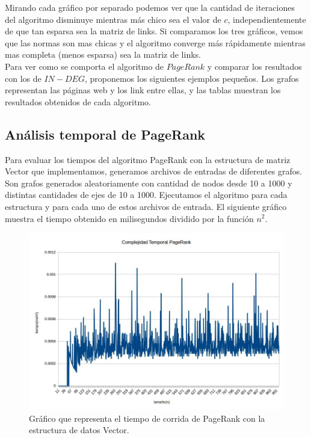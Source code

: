 Mirando cada gráfico por separado podemos ver que la cantidad de iteraciones del algoritmo disminuye mientras más chico sea el valor de $c$, independientemente de que tan esparsa sea la matriz de links. 
Si comparamos los tres gráficos, vemos que las normas son mas chicas y el algoritmo converge más rápidamente mientras mas completa (menos esparsa) sea la matriz de links.\\






Para ver como se comporta el algoritmo de $PageRank$ y comparar los resultados con los de $IN-DEG$, proponemos los siguientes ejemplos pequeños. Los grafos representan las páginas web y los link entre ellas, y las tablas muestran los resultados obtenidos de cada algoritmo.\\




\subsection{Análisis temporal de PageRank}

Para evaluar los tiempos del algoritmo PageRank con la estructura de matriz Vector que implementamos, generamos archivos de entradas de diferentes grafos. Son grafos generados aleatoriamente con cantidad de nodos desde 10 a 1000 y distintas cantidades de ejes de 10 a 1000. 
Ejecutamos el algoritmo para cada estructura y para cada uno de estos archivos de entrada. El siguiente gráfico muestra el tiempo obtenido en milisegundos dividido por la función $n^{2}$.\\


\begin{figure}[h]
  \includegraphics[scale= 0.4]{imagenes/complejidad-temporal-pagerank.png}
   \caption{Gráfico que representa el tiempo de corrida de PageRank con la estructura de datos Vector.}
  \label{fig:img1}
\end{figure}

